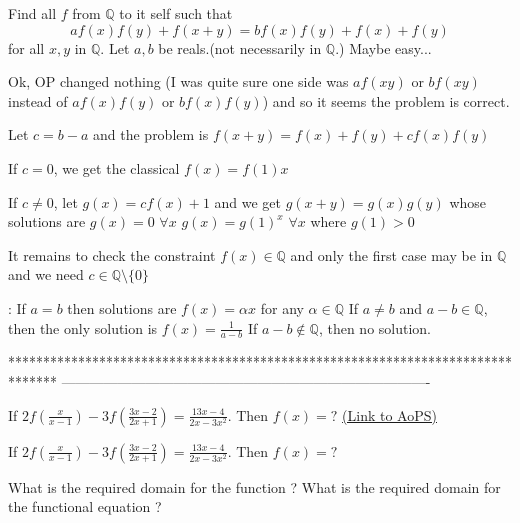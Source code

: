 \begin{solution}
	\begin{tcolorbox}Find all $f$ from $\mathbb{Q}$ to it self such that
\[af(x)f(y)+f(x+y)=bf(x)f(y)+f(x)+f(y)\]
for all $x,y$ in  $\mathbb{Q}$. Let $a,b$ be reals.(not necessarily in $\mathbb{Q}$.)
Maybe easy...\end{tcolorbox}
Ok, OP changed nothing (I was quite sure one side was $af(xy)$ or $bf(xy)$ instead of $af(x)f(y)$ or $bf(x)f(y)$) and so it seems the problem is correct.

Let $c=b-a$ and the problem is $f(x+y)=f(x)+f(y)+cf(x)f(y)$

If $c=0$, we get the classical $f(x)=f(1)x$

If $c\ne 0$, let $g(x)=cf(x)+1$ and we get $g(x+y)=g(x)g(y)$ whose solutions are
$g(x)=0$ $\forall x$
$g(x)=g(1)^x$ $\forall x$ where $g(1)>0$

It remains to check the constraint $f(x)\in\mathbb Q$ and only the first case may be in $\mathbb Q$ and we need $c\in\mathbb Q\setminus\{0\}$

 :
If $a=b$ then solutions are $f(x)=\alpha x$ for any $\alpha\in\mathbb Q$
If $a\ne b$ and $a-b\in\mathbb Q$, then the only solution is $f(x)=\frac 1{a-b}$
If $a-b\notin\mathbb Q$, then no solution.
\end{solution}
*******************************************************************************
-------------------------------------------------------------------------------

\begin{problem}
	If $2f(\frac{x}{x-1})-3f(\frac{3x-2}{2x+1})=\frac{13x-4}{2x-3x^2}$. Then $f(x)=?$
	\flushright \href{https://artofproblemsolving.com/community/c6h464531}{(Link to AoPS)}
\end{problem}



\begin{solution}
	\begin{tcolorbox}If $2f(\frac{x}{x-1})-3f(\frac{3x-2}{2x+1})=\frac{13x-4}{2x-3x^2}$. Then $f(x)=?$\end{tcolorbox}

What is the required domain for the function ?
What is the required domain for the functional equation ?
\end{solution}




